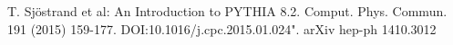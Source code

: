 \begin{thebibliography}{}
    
T. Sjöstrand et al: An Introduction to PYTHIA 8.2. Comput. Phys. Commun. 191 (2015) 159-177. DOI:10.1016/j.cpc.2015.01.024". arXiv hep-ph 1410.3012




\end{thebibliography}



